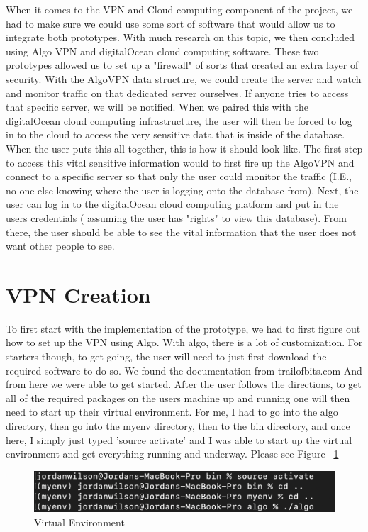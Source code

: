 When it comes to the VPN and Cloud computing component of the project, we had to make
sure we could use some sort of software that would allow us to integrate both prototypes.
With much research on this topic, we then concluded using Algo VPN
and digitalOcean cloud computing software. These two prototypes allowed us to set up
a "firewall" of sorts that created an extra layer of security. With the AlgoVPN data
structure, we could create the server and watch and monitor traffic on that
dedicated server ourselves. If anyone tries to access that specific server, we will be
notified. When we paired this with the digitalOcean cloud computing infrastructure, the user will
then be forced to log in to the cloud to access the very sensitive data that
is inside of the database. When the user puts this all together, this is how it should look
like. The first step to access this vital sensitive information would to first
fire up the AlgoVPN and connect to a specific server so that only the user could monitor
the traffic (I.E., no one else knowing where the user is logging onto the database from).
Next, the user can log in to the digitalOcean cloud computing platform and put in the users credentials (
assuming the user has "rights" to view this database). From there, the user should be able to
see the vital information that the user does not want other people to see.


\section{VPN Creation}
\label{sec:vpn creation}


To first start with the implementation of the prototype, we had to first figure
out how to set up the VPN using Algo. With algo, there is a lot of customization.
For starters though, to get going, the user will need to just first download the
required software to do so. We found the documentation from trailofbits.com
And from here we were able to get started. After the user follows the directions, to get
all of the required packages on the users machine up and running one will then need to start up
their virtual environment. For me, I had to go into the algo directory,
then go into the myenv directory, then to the bin directory, and once here, I simply just typed
'source activate' and I was able to start up the virtual environment and get everything running
and underway. Please see Figure ~\ref{fig:virtual environment}

\bigskip
\bigskip
\begin{figure}[hbt!]
\centering
\includegraphics[width=5in]{../images/myenv-1.png}%
\caption{Virtual Environment}
\label{fig:virtual environment}
\end{figure}
\bigskip
\bigskip



